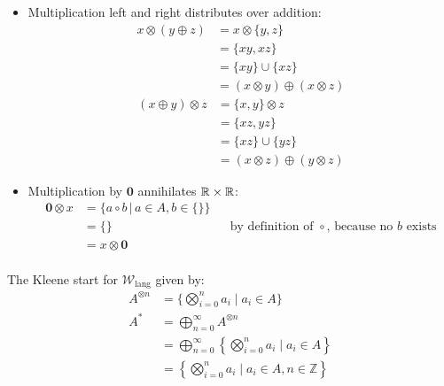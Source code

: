 \documentclass[a4paper,12pt]{ETHexercise}
\begin{document}
\begin{question}
\begin{subquestion}
\begin{itemize}
			\item Multiplication left and right distributes over addition:
			      \begin{align}
				      x \otimes \left( y \oplus z\right) & = x \otimes \{y, z\}                                          \\
				                                         & = \{xy, xz\}                                                  \\
				                                         & = \{xy\} \cup \{xz\}                                          \\
				                                         & = \left( x \otimes y \right) \oplus \left( x \otimes z\right)
			      \end{align}
			      \begin{align}
				      \left(x \oplus y\right) \otimes z & = \{x, y\} \otimes z                                         \\
				                                        & = \{xz, yz\}                                                 \\
				                                        & = \{xz\} \cup \{yz\}                                         \\
				                                        & = \left( x \otimes z\right) \oplus \left( y \otimes z\right)
			      \end{align}
			\item Multiplication by $\mathbf{0}$ annihilates $\mathbb{R} \times \mathbb{R}$:
			      \begin{align}
				      \mathbf{0} \otimes x & = \{a \circ b \,|\, a \in A, b \in \{\}\}                                                             \\
				                           & = \{\}                                    &  & \text{by definition of $\circ$, because no $b$ exists} \\
				                           & = x \otimes \mathbf{0}                                                                                \\
			      \end{align}
		\end{itemize}
		The Kleene start for $\mathcal{W}_{\text{lang}}$ given by:
		\begin{align}
			A^{\otimes n} & = \{ \bigotimes_{i=0}^{n} a_i \;|\; a_i \in A\}                                     \\
			A^*           & = \bigoplus_{n=0}^{\infty} A^{\otimes n}                                            \\
			              & = \bigoplus_{n=0}^{\infty} \left\{ \bigotimes_{i=0}^{n} a_i \;|\; a_i \in A\right\} \\
			              & = \left\{ \bigotimes_{i=0}^{n} a_i \;|\; a_i \in A, n \in \mathbb{Z} \right\}
		\end{align}
	\end{subquestion}
\end{question}
\end{document}
